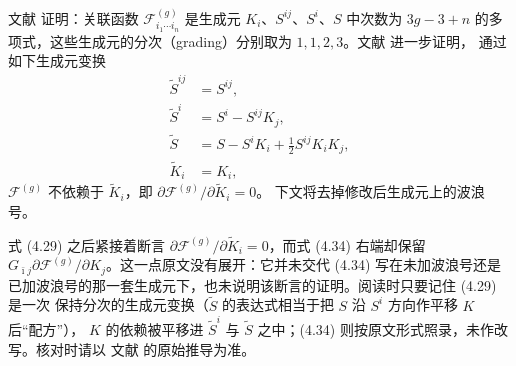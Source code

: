 文献 \cite{ref22} 证明：关联函数 $\mathcal{F}^{(g)}_{i_1\cdots i_n}$ 是生成元 $K_i$、$S^{ij}$、$S^i$、$S$
中次数为 $3g-3+n$ 的多项式，这些生成元的分次（grading）分别取为 $1,1,2,3$。文献 \cite{ref22} 进一步证明，
通过如下生成元变换
\begin{equation}\tag{4.29}
\begin{aligned}
  \tilde S^{ij} &= S^{ij}, \\
  \tilde S^i &= S^i - S^{ij}K_j, \\
  \tilde S &= S - S^iK_i + \frac{1}{2}S^{ij}K_iK_j, \\
  \tilde K_i &= K_i,
\end{aligned}
\end{equation}
$\mathcal{F}^{(g)}$ 不依赖于 $\tilde K_i$，即 $\partial\mathcal{F}^{(g)}/\partial\tilde K_i=0$。
下文将去掉修改后生成元上的波浪号。

\begin{yizhu}[含糊点]
式 (4.29) 之后紧接着断言 $\partial\mathcal{F}^{(g)}/\partial\tilde K_i=0$，而式 (4.34) 右端却保留
$G_{\bar\imath j}\partial\mathcal{F}^{(g)}/\partial K_j$。这一点原文没有展开：它并未交代 (4.34)
写在未加波浪号还是已加波浪号的那一套生成元下，也未说明该断言的证明。阅读时只要记住 (4.29) 是一次
保持分次的生成元变换（$\tilde S$ 的表达式相当于把 $S$ 沿 $S^i$ 方向作平移 $K$ 后“配方”），
$K$ 的依赖被平移进 $\tilde S^i$ 与 $\tilde S$ 之中；(4.34) 则按原文形式照录，未作改写。核对时请以
文献 \cite{ref22} 的原始推导为准。
\end{yizhu}

